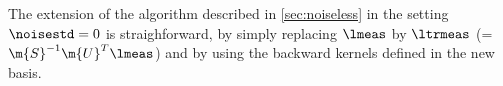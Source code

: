 The extension of the algorithm described in \cref{sec:noiseless} in the setting $\noisestd=0$ is straighforward, by simply
replacing $\lmeas$ by $\ltrmeas$ (=$\m{S}^{-1} \m{U}^T \lmeas$) and by using the backward kernels defined in the new basis.